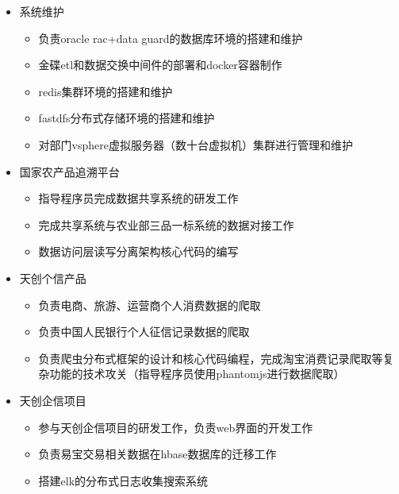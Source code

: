 \documentclass{resume}
\begin{document}
\begin{itemize}
  \item 系统维护
  \begin{itemize}
    \item 负责oracle rac+data guard的数据库环境的搭建和维护
    \item 金碟etl和数据交换中间件的部署和docker容器制作
    \item redis集群环境的搭建和维护
    \item fastdfs分布式存储环境的搭建和维护
    \item 对部门vsphere虚拟服务器（数十台虚拟机）集群进行管理和维护
  \end{itemize}
  \item 国家农产品追溯平台
  \begin{itemize}
    \item 指导程序员完成数据共享系统的研发工作
    \item 完成共享系统与农业部三品一标系统的数据对接工作
    \item 数据访问层读写分离架构核心代码的编写
  \end{itemize}
\end{itemize}

\begin{itemize}
  \item 天创个信产品
  \begin{itemize}
    \item 负责电商、旅游、运营商个人消费数据的爬取
    \item 负责中国人民银行个人征信记录数据的爬取
    \item 负责爬虫分布式框架的设计和核心代码编程，完成淘宝消费记录爬取等复杂功能的技术攻关（指导程序员使用phantomjs进行数据爬取）
  \end{itemize}
  \item 天创企信项目
  \begin{itemize}
    \item 参与天创企信项目的研发工作，负责web界面的开发工作
    \item 负责易宝交易相关数据在hbase数据库的迁移工作
    \item 搭建elk的分布式日志收集搜索系统
  \end{itemize}
\end{itemize}
\end{document}
